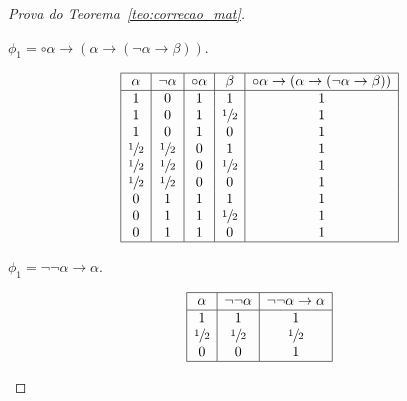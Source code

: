 \begin{proof}[Prova do Teorema~\ref{teo:correcao_mat}]
\begin{provaporcasos}
\begin{provaporsubcasos}
                 

                \subcasodeprova{} $\phi_{1} = \circ \alpha \to (\alpha \to (\neg \alpha \to \beta))$. 


                \begin{center}
                    \[
                        \begin{array}{|c|c|c|c|c|}%
                            \hline%
                            \alpha      & \neg \alpha &\circ \alpha & \beta & \circ \alpha \to (\alpha \to (\neg \alpha \to \beta)) \\
                            \hline%
                            1 & 0 & 1 & 1 & 1 \\
                            1 & 0 & 1 & \meio{} & 1 \\
                            1 & 0 & 1 & 0 & 1 \\
                            \meio{} & \meio{} & 0 & 1 & 1 \\
                            \meio{} & \meio{} & 0 & \meio{} & 1 \\
                            \meio{} & \meio{} & 0 & 0 & 1 \\
                            0 & 1 & 1 & 1 & 1 \\
                            0 & 1 & 1 & \meio{} & 1 \\
                            0 & 1 & 1 & 0 & 1 \\
                            \hline%
                        \end{array}
                    \]
                \end{center}
                
                  
                \subcasodeprova{} $\phi_{1} = \neg \neg \alpha \to \alpha$. 

                \begin{center}
                    \[
                        \begin{array}{|c|c|c|}%
                            \hline%
                            \alpha      & \neg \neg \alpha & \neg \neg \alpha \to \alpha \\
                            \hline%
                            1 & 1 & 1\\
                            \meio{} & \meio{} & \meio{}\\
                            0 & 0 & 1\\
                            \hline%
                        \end{array}
                    \]
                \end{center}
                    

\end{provaporsubcasos}
\end{provaporcasos}
\end{proof}
